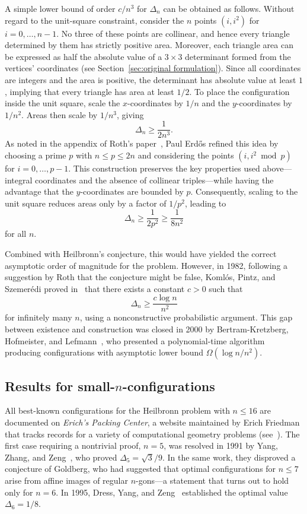 \documentclass[11pt,a4paper]{article}
\theoremstyle{plain}
\theoremstyle{definition}
\theoremstyle{remark}
\begin{document}
A simple lower bound of order $c/n^3$ for $\Delta_n$ can be obtained as follows. 
Without regard to the unit-square constraint, consider the $n$ points $(i,i^2)$ for $i=0,\ldots,n-1$. 
No three of these points are collinear, and hence every triangle determined by them has strictly positive area. 
Moreover, each triangle area can be expressed as half the absolute value of a $3\times 3$ determinant formed from the vertices' coordinates (see Section~\ref{sec:original formulation}). 
Since all coordinates are integers and the area is positive, the determinant has absolute value at least $1$, implying that every triangle has area at least $1/2$.
To place the configuration inside the unit square, scale the $x$-coordinates by $1/n$ and the $y$-coordinates by $1/n^2$. 
Areas then scale by $1/n^3$, giving
\[
\Delta_n \ge \frac{1}{2n^3}.
\]
As noted in the appendix of Roth's paper~\cite{Roth1951}, Paul Erd\H{o}s refined this idea by choosing a prime $p$ with $n \le p \le 2n$ and considering the points $(i, i^2 \bmod p)$ for $i=0,\ldots,p-1$. 
This construction preserves the key properties used above—integral coordinates and the absence of collinear triples—while having the advantage that the $y$-coordinates are bounded by $p$. 
Consequently, scaling to the unit square reduces areas only by a factor of $1/p^2$, leading to
\[
\Delta_n \ge \frac{1}{2p^2} \ge \frac{1}{8n^2}
\]
for all $n$.

Combined with Heilbronn's conjecture, this would have yielded the correct asymptotic order of magnitude for the problem. 
However, in 1982, following a suggestion by Roth that the conjecture might be false, Koml\'os, Pintz, and Szemer\'edi proved in~\cite{KPS1982} that there exists a constant $c>0$ such that
\[
\Delta_n \ge \frac{c \log n}{n^2}
\]
for infinitely many $n$, using a nonconstructive probabilistic argument. 
This gap between existence and construction was closed in 2000 by Bertram-Kretzberg, Hofmeister, and Lefmann~\cite{BHL2000}, who presented a polynomial-time algorithm producing configurations with asymptotic lower bound $\Omega(\log n/n^2)$.


\subsection{Results for small-$n$-configurations}

All best-known configurations for the Heilbronn problem with $n \le 16$ are documented on \emph{Erich's Packing Center}, a website maintained by Erich Friedman that tracks records for a variety of computational geometry problems (see~\cite{FriedmanPackingCenter}).
The first case requiring a nontrivial proof, $n=5$, was resolved in 1991 by Yang, Zhang, and Zeng~\cite{yzz91}, who proved
$\Delta_5 = \sqrt{3}/9$.
In the same work, they disproved a conjecture of Goldberg, who had suggested that optimal configurations for $n \le 7$ arise from affine images of regular $n$-gons—a statement that turns out to hold only for $n=6$.
In 1995, Dress, Yang, and Zeng~\cite{dyz1995} established the optimal value $\Delta_6 = 1/8$.
\end{document}
